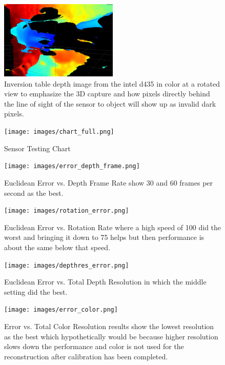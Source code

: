\begin{figure}[h]
        \caption{Inversion table depth image from the intel d435 in color at a rotated view to emphasize the 3D capture and how pixels directly behind the line of sight of the sensor to object will show up as invalid dark pixels.}
        \centering
        \includegraphics[width=0.5\textwidth]{images/inversion_depth.png}
\end{figure}


\begin{figure}[h]
        \caption{Sensor Testing Chart}
        \centering
        \texttt{[image: images/chart\_full.png]}
\end{figure}
 
 
\begin{figure}[h]
        \caption{Euclidean Error vs. Depth Frame Rate show 30 and 60 frames per second as the best.}
        \centering
        \texttt{[image: images/error\_depth\_frame.png]}
\end{figure}
  
\begin{figure}[h]
        \caption{Euclidean Error vs. Rotation Rate where a high speed of 100 did the worst and bringing it down to 75 helps but then performance is about the same below that speed.}
        \centering
        \texttt{[image: images/rotation\_error.png]}
\end{figure}
  
\begin{figure}[h]
        \caption{Euclidean Error vs. Total Depth Resolution in which the middle setting did the best.}
        \centering
        \texttt{[image: images/depthres\_error.png]}
\end{figure}

\begin{figure}[h]
        \caption{Error vs. Total Color Resolution results show the lowest resolution as the best which hypothetically would be because higher resolution slows down the performance and color is not used for the reconstruction after calibration has been completed.}
        \centering
        \texttt{[image: images/error\_color.png]}
\end{figure}
 

